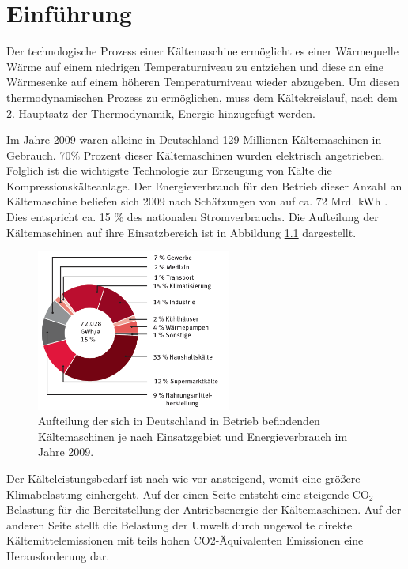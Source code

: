 \chapter{Einführung}
\label{cha:Einfuehrung}

Der technologische Prozess einer Kältemaschine ermöglicht es einer Wärmequelle Wärme  auf einem niedrigen Temperaturniveau zu entziehen und diese an eine Wärmesenke auf einem höheren Temperaturniveau wieder abzugeben. Um diesen thermodynamischen Prozess zu ermöglichen, muss dem  Kältekreislauf, nach dem 2. Hauptsatz der Thermodynamik, Energie hinzugefügt werden. 

Im Jahre 2009 waren alleine in Deutschland 129 Millionen Kältemaschinen in Gebrauch. 70$\%$ Prozent dieser Kältemaschinen wurden elektrisch angetrieben. Folglich ist die wichtigste Technologie zur Erzeugung von Kälte die Kompressionskälteanlage. Der Energieverbrauch für den Betrieb dieser Anzahl an Kältemaschine beliefen sich 2009 nach Schätzungen von \citeauthor{Preuss2011} auf  ca. 72 Mrd. kWh . Dies entspricht ca. 15 $\%$ des nationalen Stromverbrauchs. Die Aufteilung der Kältemaschinen auf ihre Einsatzbereich ist in Abbildung \ref{fig:Aufteilung nach Einsatzgebiet} dargestellt. \citep{M.Stoeckner2012} \citep{EnergieAgenturNRW2010}

\begin{figure}[htb]
	\centering
		\includegraphics[width=0.570\textwidth]{Pictures/Energieverbrauch_Aufteilung_Karlsruhe.png}
	\caption{Aufteilung der sich in Deutschland in Betrieb befindenden Kältemaschinen je nach Einsatzgebiet und Energieverbrauch im Jahre 2009. \citep{M.Stoeckner2012}}
	\label{fig:Aufteilung nach Einsatzgebiet}
\end{figure}

Der Kälteleistungsbedarf ist nach wie vor ansteigend, womit eine größere Klimabelastung einhergeht. Auf der einen Seite entsteht eine steigende CO$_{2}$ Belastung für die Bereitstellung der Antriebsenergie der Kältemaschinen. Auf der anderen Seite stellt die Belastung der Umwelt durch ungewollte direkte Kältemittelemissionen mit teils hohen CO2-Äquivalenten Emissionen eine Herausforderung dar.

